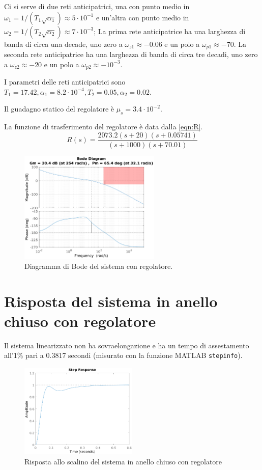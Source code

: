 \documentclass[a4paper]{article}
\begin{document}
Ci si serve di due reti anticipatrici, una con punto medio in $\omega_1 = 1/ (T_1 \sqrt{\alpha_1}) \approx 5 \cdot 10^{-1}$ e un'altra con punto medio in $\omega_2 = 1/ (T_2 \sqrt{\alpha_2}) \approx 7 \cdot 10^{-3}$;
La prima rete anticipatrice ha una larghezza di banda di circa una  decade, uno zero a $\omega_{z1} \approx -0.06$ e un polo a $\omega_{p1} \approx -70$. 
La seconda rete anticipatrice ha una larghezza di banda di circa tre decadi, uno zero a $\omega_{z2} \approx -20$ e un polo a $\omega_{p2} \approx -10^{-3}$.

I parametri delle reti anticipatrici sono $T_1 = 17.42, \alpha_1 = 8.2 \cdot 10^{-4}, T_2 = 0.05, \alpha_2 = 0.02$.

Il guadagno statico del regolatore è $\mu_s = 3.4 \cdot 10^{-2}$.

La funzione di trasferimento del regolatore è data dalla \cref{eqn:R}.
\begin{equation}
    \label{eqn:R}
    R(s) = \frac{2073.2 (s+20) (s+0.05741)}{(s+1000) (s+70.01)}
\end{equation}
\begin{figure}[h]
    \centering
    \includegraphics[width=0.6\textwidth]{bode_L}
    \caption{Diagramma di Bode del sistema con regolatore.}
    \label{fig:bode_L}
\end{figure}
\section{Risposta del sistema in anello chiuso con regolatore}
Il sistema linearizzato non ha sovraelongazione e ha un tempo di assestamento all'1\% pari a 0.3817 secondi (misurato con la funzione MATLAB \texttt{stepinfo}).
\begin{figure}[h]
    \centering
    \includegraphics[width=0.5\textwidth]{step}
    \caption{Risposta allo scalino del sistema in anello chiuso con regolatore}
    \label{fig:step}
\end{figure}
\end{document}
